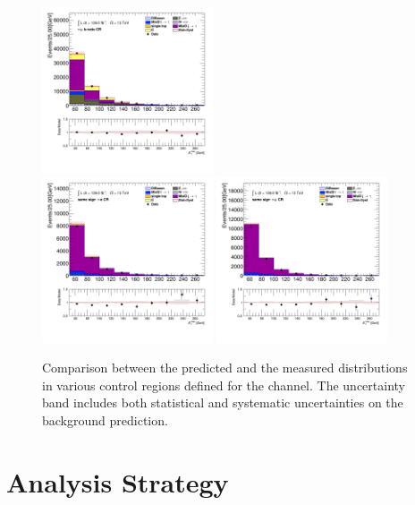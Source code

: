\begin{figure}[!thp]
\begin{center}
			\includegraphics[width=0.45\textwidth]{chapters/chapter6_HPlus/images/taulep/met_et_TAUMU_BVETO.png} \\
			\includegraphics[width=0.45\textwidth]{chapters/chapter6_HPlus/images/taulep/met_et_SS_TAUEL.png} 
			\includegraphics[width=0.45\textwidth]{chapters/chapter6_HPlus/images/taulep/met_et_SS_TAUMU.png} \\
			\end{center}
			\caption{
			Comparison between the predicted and the measured \Etm distributions in various control regions defined for the \taulep channel. The uncertainty band includes both statistical and systematic uncertainties on the background prediction. 
			}
			\label{fig:bkg-met-taulep}
		\end{figure}

	\section{Analysis Strategy}\label{sec:ana-strat}

